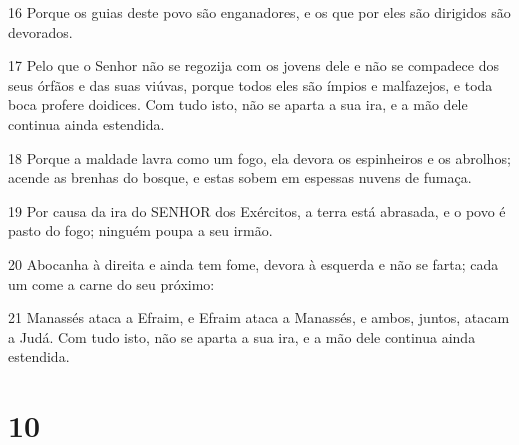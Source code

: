 \par 16 Porque os guias deste povo são enganadores, e os que por eles são dirigidos são devorados.
\par 17 Pelo que o Senhor não se regozija com os jovens dele e não se compadece dos seus órfãos e das suas viúvas, porque todos eles são ímpios e malfazejos, e toda boca profere doidices. Com tudo isto, não se aparta a sua ira, e a mão dele continua ainda estendida.
\par 18 Porque a maldade lavra como um fogo, ela devora os espinheiros e os abrolhos; acende as brenhas do bosque, e estas sobem em espessas nuvens de fumaça.
\par 19 Por causa da ira do SENHOR dos Exércitos, a terra está abrasada, e o povo é pasto do fogo; ninguém poupa a seu irmão.
\par 20 Abocanha à direita e ainda tem fome, devora à esquerda e não se farta; cada um come a carne do seu próximo:
\par 21 Manassés ataca a Efraim, e Efraim ataca a Manassés, e ambos, juntos, atacam a Judá. Com tudo isto, não se aparta a sua ira, e a mão dele continua ainda estendida.

\chapter{10}

